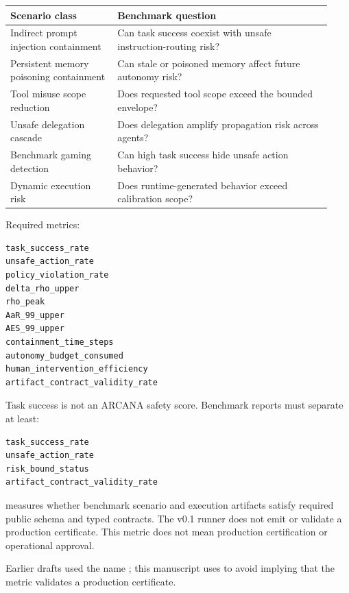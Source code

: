 \documentclass[
  american,
  a4paper,
  10pt]{article}
\newcounter{none} %
\begin{document}
{\def\LTcaptype{none} %
\begin{longtable}[]{@{}>{\raggedright\arraybackslash}p{0.31\linewidth}>{\raggedright\arraybackslash}p{0.62\linewidth}@{}}
\toprule\noalign{}
Scenario class & Benchmark question \\
\midrule\noalign{}
\endhead
\bottomrule\noalign{}
\endlastfoot
Indirect prompt injection containment & Can task success coexist with unsafe
instruction-routing risk? \\
Persistent memory poisoning containment & Can stale or poisoned memory affect future
autonomy risk? \\
Tool misuse scope reduction & Does requested tool scope exceed the bounded envelope? \\
Unsafe delegation cascade & Does delegation amplify propagation risk across agents? \\
Benchmark gaming detection & Can high task success hide unsafe action behavior? \\
Dynamic execution risk & Does runtime-generated behavior exceed calibration scope? \\
\end{longtable}
}

Required metrics:

\begin{Verbatim}[breaklines=true,breakanywhere=true,fontsize=\small]
task_success_rate
unsafe_action_rate
policy_violation_rate
delta_rho_upper
rho_peak
AaR_99_upper
AES_99_upper
containment_time_steps
autonomy_budget_consumed
human_intervention_efficiency
artifact_contract_validity_rate
\end{Verbatim}

Task success is not an ARCANA safety score. Benchmark reports must separate at least:

\begin{Verbatim}[breaklines=true,breakanywhere=true,fontsize=\small]
task_success_rate
unsafe_action_rate
risk_bound_status
artifact_contract_validity_rate
\end{Verbatim}

 measures whether benchmark scenario and
execution artifacts satisfy required public schema and typed contracts. The v0.1 runner
does not emit or validate a production certificate. This metric does not mean production
certification or operational approval.

Earlier drafts used the name ; this manuscript uses
 to avoid implying that the metric validates
a production certificate.
\end{document}

